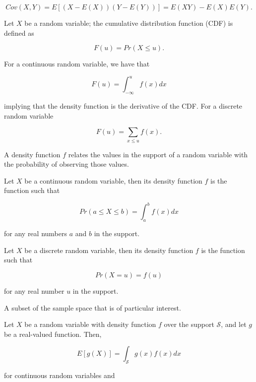 \documentclass[
  letterpaper,
  DIV=11,
  numbers=noendperiod]{scrreprt}
\providecommand{\tightlist}{%
  \setlength{\itemsep}{0pt}\setlength{\parskip}{0pt}}\usepackage{longtable,booktabs,array}
\theoremstyle{definition}
\theoremstyle{plain}
\theoremstyle{definition}
\theoremstyle{remark}
\begin{document}
\[Cov(X,Y) = E\left[(X - E(X))(Y - E(Y))\right] = E(XY) - E(X) E(Y).\]

\begin{description}
\tightlist
\item[Cumulative Distribution Function (CDF) (Definition~\ref{def-cdf})]
Let \(X\) be a random variable; the cumulative distribution function
(CDF) is defined as
\end{description}

\[F(u) = Pr(X \leq u).\]

For a continuous random variable, we have that

\[F(u) = \int_{-\infty}^{u} f(x) dx\]

implying that the density function is the derivative of the CDF. For a
discrete random variable

\[F(u) = \sum_{x \leq u} f(x).\]

\begin{description}
\tightlist
\item[Density Function (Definition~\ref{def-density-function})]
A density function \(f\) relates the values in the support of a random
variable with the probability of observing those values.
\end{description}

Let \(X\) be a continuous random variable, then its density function
\(f\) is the function such that

\[Pr(a \leq X \leq b) = \int_a^b f(x) dx\]

for any real numbers \(a\) and \(b\) in the support.

Let \(X\) be a discrete random variable, then its density function \(f\)
is the function such that

\[Pr(X = u) = f(u)\]

for any real number \(u\) in the support.

\begin{description}
\tightlist
\item[Event (Definition~\ref{def-event})]
A subset of the sample space that is of particular interest.
\item[Expectation of a Function (Definition~\ref{def-expectation})]
Let \(X\) be a random variable with density function \(f\) over the
support \(\mathcal{S}\), and let \(g\) be a real-valued function. Then,
\end{description}

\[E\left[g(X)\right] = \int_{\mathcal{S}} g(x) f(x) dx\]

for continuous random variables and
\end{document}
